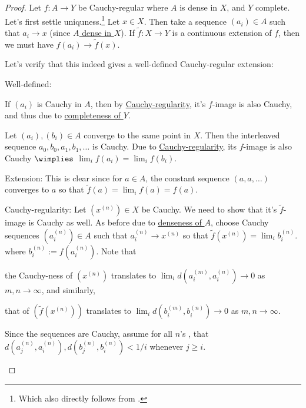 	\begin{proof}
		Let $f\colon A\to Y$ be Cauchy-regular where $A$ is dense in $X$, and $Y$ complete. Let's first settle uniquness.\footnote{Which also directly follows from .} Let $x\in X$. Then take a sequence $(a_i)\in A$ such that $a_i\to x$ (since \uline{$A$ dense in $X$}). If $\tilde f\colon X\to Y$ is a continuous extension of $f$, then we must have $f(a_i)\to \tilde f(x)$.
		
		Let's verify that this indeed gives a well-defined Cauchy-regular extension:
		\begin{prooflist}
			\item Well-defined:
			\begin{mylist}
				\item If $(a_i)$ is Cauchy in $A$, then by \uline{Cauchy-regularity}, it's $f$-image is also Cauchy, and thus \cgt due to \uline{completeness of $Y$}.
				
				\item Let $(a_i), (b_i)\in A$ converge to the same point in $X$. Then the interleaved sequence $a_0, b_0, a_1, b_1, \ldots$ is Cauchy. Due to \uline{Cauchy-regularity}, its $f$-image is also Cauchy $\wimplies$ $\lim_i f(a_i) = \lim_i f(b_i)$.
			\end{mylist}
			
			
			
			\item Extension:
			This is clear since for $a\in A$, the constant sequence $(a, a, \ldots)$ converges to $a$ so that $\tilde f(a) = \lim_i f(a) = f(a)$.
			
			
			
			\item Cauchy-regularity:
			Let $(x^{(n)})\in X$ be Cauchy. We need to show that it's $\tilde f$-image is Cauchy as well. As before due to \uline{denseness of $A$}, choose Cauchy sequences $( a^{(n)}_i )\in A$ such that $a^{(n)}_i\to x^{(n)}$ so that $\tilde f(x^{(n)}) = \lim_i b^{(n)}_i$. where $b^{(n)}_i := f(a^{(n)}_i)$. Note that
			\begin{mylist}
				\item the Cauchy-ness of $(x^{(n)})$ translates to $\lim_i d(a^{(m)}_i, a^{(n)}_i)\to 0$ as $m, n\to\infty$, and similarly,
				
				\item that of $(\tilde f(x^{(n)}))$ translates to $\lim_i d(b^{(m)}_i, b^{(n)}_i)\to 0$ as $m, n\to\infty$.
			\end{mylist}
			Since the sequences are Cauchy, assume for all $n$'s \wlogg, that $d(a^{(n)}_j, a^{(n)}_i), d(b^{(n)}_j, b^{(n)}_i) < 1/i$ whenever $j\ge i$.
			

\end{prooflist}
\end{proof}
